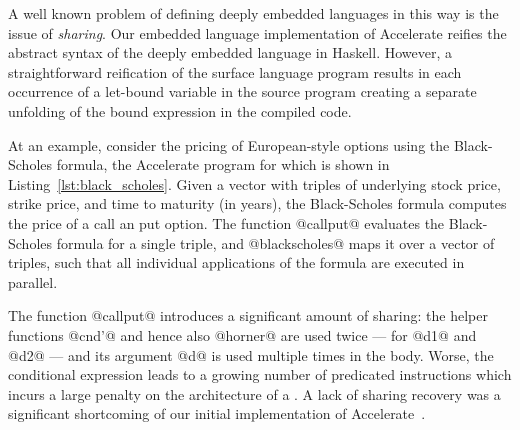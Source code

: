 A well known problem of defining deeply embedded languages in this way is the issue of
\emph{sharing}. Our embedded language implementation of Accelerate reifies the abstract syntax of
the deeply embedded language in Haskell. However, a straightforward reification of the surface
language program results in each occurrence of a let-bound variable in the source program creating a
separate unfolding of the bound expression in the compiled code.

At an example, consider the pricing of European-style options using the Black-Scholes formula, the
Accelerate program for which is shown in Listing~\ref{lst:black_scholes}. Given a vector with
triples of underlying stock price, strike price, and time to maturity (in years), the Black-Scholes
formula computes the price of a call an put option. The function @callput@ evaluates the
Black-Scholes formula for a single triple, and @blackscholes@ maps it over a vector of triples,
such that all individual applications of the formula are executed in parallel.

The function @callput@ introduces a significant amount of sharing: the helper functions
@cnd'@ and hence also @horner@ are used twice --- for @d1@ and @d2@ --- and its
argument @d@ is used multiple times in the body. Worse, the conditional expression leads to a
growing number of predicated instructions which incurs a large penalty on the \SIMD architecture of
a \GPU\@. A lack of sharing recovery was a significant shortcoming of our initial implementation of
Accelerate~\cite{Chakravarty:2011fr}.

%


